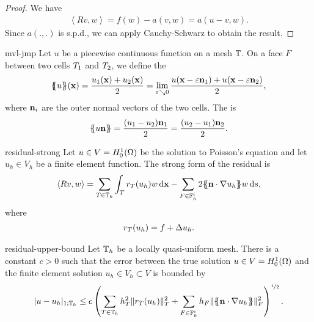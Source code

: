\begin{proof}
  We have
  \begin{gather}
    \left<Rv,w\right>
    = f(w) - a(v,w)
    = a(u-v,w).
  \end{gather}
  Since $a(.,.)$ is s.p.d., we can apply Cauchy-Schwarz to obtain the result.
\end{proof}

\begin{Definition}{mvl-jmp}
  Let $u$ be a piecewise continuous function on a mesh $\mathbb T$. On a
  face $F$ between two cells $T_1$ and $T_2$, we define the
  \begin{gather}
    \{\!\!\{u\}\!\!\}(\mathbf x) = \frac{u_1(\mathbf x) + u_2(\mathbf x)}2
    = \lim_{\varepsilon\searrow 0}
    \frac{u(\mathbf x-\varepsilon \mathbf n_1) + u(\mathbf x - \varepsilon\mathbf n_2)}2,
  \end{gather}
  where $\mathbf n_i$ are the outer normal vectors of the two cells. The
   is
  \begin{gather}
    \{\!\!\{u\mathbf n\}\!\!\} = \frac{(u_1-u_2)\mathbf n_1}2 = \frac{(u_2-u_1)\mathbf n_2}2.
  \end{gather}
\end{Definition}
\begin{Definition}{residual-strong}
  Let $u\in V=H^1_0(\Omega)$ be the solution to Poisson's equation
  and let $u_h\in V_h$ be a finite element function.  The strong form
  of the residual is
  \begin{gather}
    \left<Rv,w\right> = \sum_{T\in\mathbb T_h}\int_{T} r_T(u_h) w\,\mathrm{d} \mathbf x
    - \sum_{F\in \mathbb F_h^i} 2\{\!\!\{\mathbf n\cdot\nabla u_h\}\!\!\} w\,\mathrm{d} s,
  \end{gather}
  where
  \begin{gather}
    r_T(u_h) = f + \Delta u_h.
  \end{gather}
\end{Definition}

\begin{Lemma}{residual-upper-bound}
  Let $\mathbb T_h$ be a locally quasi-uniform mesh.
  There is a constant $c>0$ such that the error between the true
  solution $u\in V=H^1_0(\Omega)$ and the finite element solution
  $u_h\in V_h \subset V$ is bounded by
  \begin{gather}
    \label{eq:fem-aposteriori:5}
    \lvert u-u_h\rvert_{1;\mathbb T_h} \le c \left(
      \sum_{T\in\mathbb T_h} h_T^2 \lVert r_T(u_h)\rVert_T^2
      + \sum_{F\in \mathbb F_h^i} h_F
      \lVert\{\!\!\{\mathbf n\cdot\nabla u_h\}\!\!\}\rVert_F^2
    \right)^{\nicefrac12}.
  \end{gather}
\end{Lemma}

